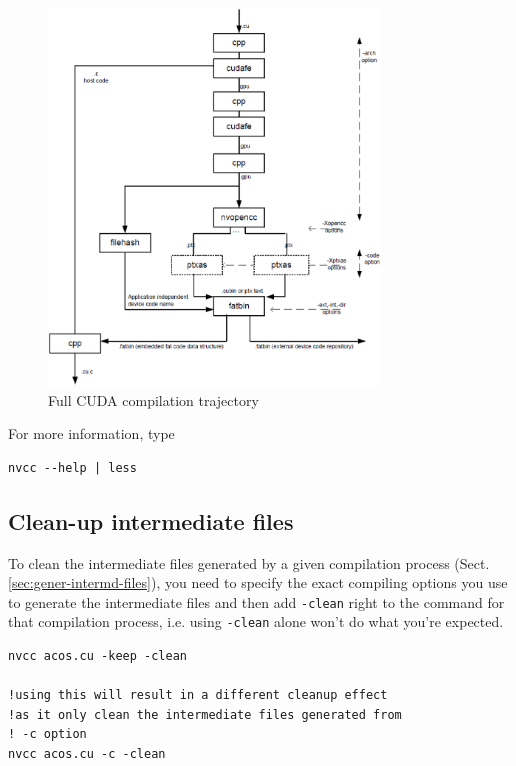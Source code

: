 \begin{figure}[hbt]
  \centerline{\includegraphics[height=10cm,
    angle=0]{./images/nvcc_trajectory.eps}}
  \caption{Full CUDA compilation trajectory}
\label{fig:nvcc_trajectory}
\end{figure}


For more information, type
\begin{verbatim}
nvcc --help | less
\end{verbatim}

\subsection{Clean-up intermediate files}
\label{sec:clean-up-interm}

To clean the intermediate files generated by a given compilation process
(Sect.\ref{sec:gener-intermd-files}), you need to specify the exact compiling
options you use to generate the intermediate files and then add \verb!-clean!
right to the command for that compilation process, i.e. using \verb!-clean!
alone won't do what you're expected.
\begin{verbatim}
nvcc acos.cu -keep -clean

!using this will result in a different cleanup effect
!as it only clean the intermediate files generated from 
! -c option
nvcc acos.cu -c -clean
\end{verbatim}



